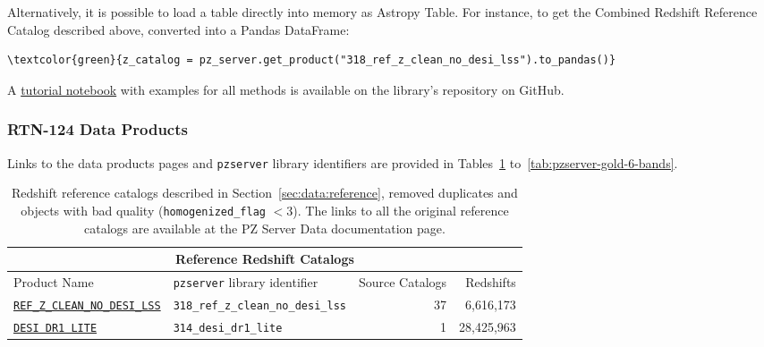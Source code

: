 Alternatively, it is possible to load a table directly into memory as Astropy Table. For instance, to get the Combined Redshift Reference Catalog described above, converted into a Pandas DataFrame:

\begin{Verbatim}[commandchars=\\\{\}]
\textcolor{green}{z_catalog = pz_server.get_product("318_ref_z_clean_no_desi_lss").to_pandas()}
\end{Verbatim}

A \href{https://github.com/linea-it/pzserver/blob/main/docs/notebooks/pzserver_tutorial.ipynb}{tutorial notebook} with examples for all  methods is available on the  library's repository on GitHub.

\subsubsection{RTN-124 Data Products} 

Links to the data products pages and \texttt{pzserver} library identifiers are provided in Tables~\ref{tab:pzserver-z-compilation} to~\ref{tab:pzserver-gold-6-bands}. 

\begin{table}
\centering
\begin{tabular}{llrr}
 \hline
 \multicolumn{4}{c}{Reference Redshift Catalogs} \\ \hline
Product Name & \texttt{pzserver} library identifier & Source Catalogs & Redshifts \\
 \hline
 \hline
\href{https://pzserver.linea.org.br/product/318_ref_z_clean_no_desi_lss}{\texttt{REF\_Z\_CLEAN\_NO\_DESI\_LSS}} &
\texttt{318\_ref\_z\_clean\_no\_desi\_lss} &
37 & 6,616,173 \\ 
\href{https://pzserver.linea.org.br/product/314_desi_dr1_lite}{\texttt{DESI DR1 LITE}} &
\texttt{314\_desi\_dr1\_lite} &
1 &
28,425,963 \\ 
\hline
\end{tabular}
\caption{Redshift reference catalogs described in Section~\ref{sec:data:reference}, removed duplicates and objects with bad quality (\texttt{homogenized\_flag} $< 3$). The links to all the original reference catalogs are available at the PZ Server Data documentation page.}
\label{tab:pzserver-z-compilation}
\end{table}


